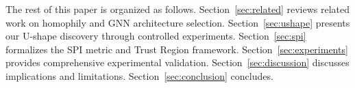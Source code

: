 The rest of this paper is organized as follows. Section~\ref{sec:related} reviews related work on homophily and GNN architecture selection. Section~\ref{sec:ushape} presents our U-shape discovery through controlled experiments. Section~\ref{sec:spi} formalizes the SPI metric and Trust Region framework. Section~\ref{sec:experiments} provides comprehensive experimental validation. Section~\ref{sec:discussion} discusses implications and limitations. Section~\ref{sec:conclusion} concludes.
